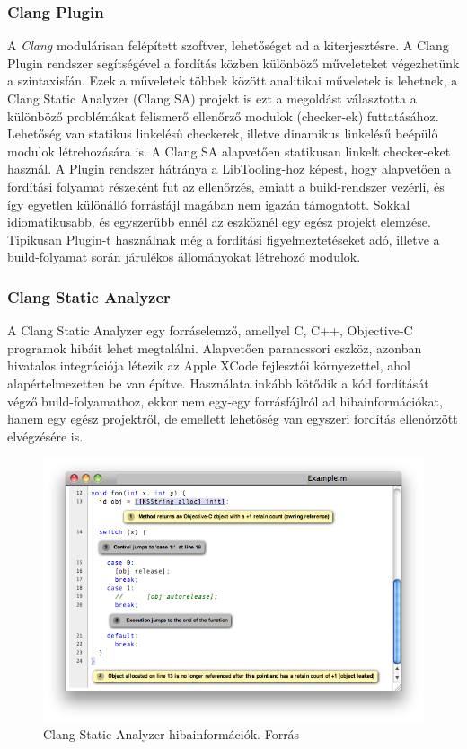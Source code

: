 \documentclass[a4paper,12pt]{report}
\begin{document}
\subsubsection{Clang Plugin}
A \emph{Clang} modulárisan felépített szoftver, lehetőséget ad a kiterjesztésre. A Clang Plugin rendszer segítségével a fordítás közben különböző műveleteket végezhetünk a szintaxisfán. Ezek a műveletek többek között analitikai műveletek is lehetnek, a Clang Static Analyzer (Clang SA) projekt is ezt a megoldást választotta a különböző problémákat felismerő ellenőrző modulok (checker-ek) futtatásához. Lehetőség van statikus linkelésű checkerek, illetve dinamikus linkelésű beépülő modulok létrehozására is. A Clang SA alapvetően statikusan linkelt checker-eket használ. A Plugin rendszer hátránya a LibTooling-hoz képest, hogy alapvetően a fordítási folyamat részeként fut az ellenőrzés, emiatt a build-rendszer vezérli, és így egyetlen különálló forrásfájl magában nem igazán támogatott. Sokkal idiomatikusabb, és egyszerűbb ennél az eszköznél egy egész projekt elemzése. Tipikusan Plugin-t használnak még a fordítási figyelmeztetéseket adó, illetve a build-folyamat során járulékos állományokat létrehozó modulok.

\subsubsection{Clang Static Analyzer}
A Clang Static Analyzer egy forráselemző, amellyel C, C++, Objective-C programok hibáit lehet megtalálni. Alapvetően parancssori eszköz, azonban hivatalos integrációja létezik az Apple XCode fejlesztői környezettel, ahol alapértelmezetten be van építve. Használata inkább kötődik a kód fordítását végző build-folyamathoz, ekkor nem egy-egy forrásfájlról ad hibainformációkat, hanem egy egész projektről, de emellett lehetőség van egyszeri fordítás ellenőrzött elvégzésére is.

\begin{figure}[h]
\caption{Clang Static Analyzer hibainformációk. Forrás \cite{clangsaimage}}
\centering
\includegraphics[scale=0.6]{analyzer_html.png}
\end{figure}
\end{document}
